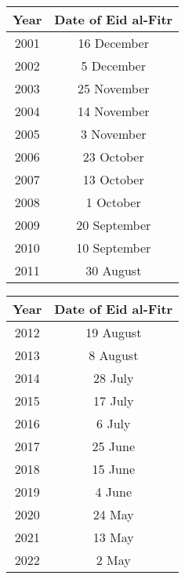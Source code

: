 \documentclass[11pt]{article}
\begin{document}
\begin{minipage}{0.5\textwidth}
	\begin{center}
		\begin{tabular}{|c|c|}
			\hline
			Year & Date of Eid al-Fitr \\ \hline
			2001 & 16 December         \\ \hline
			2002 & 5 December          \\ \hline
			2003 & 25 November         \\ \hline
			2004 & 14 November         \\ \hline
			2005 & 3 November          \\ \hline
			2006 & 23 October          \\ \hline
			2007 & 13 October          \\ \hline
			2008 & 1 October           \\ \hline
			2009 & 20 September        \\ \hline
			2010 & 10 September        \\ \hline
			2011 & 30 August           \\ \hline
		
		\end{tabular}
	\end{center}
\end{minipage}
\begin{minipage}{0.5\textwidth}
	\begin{center}
	\begin{tabular}{|c|c|}
		\hline
		Year & Date of Eid al-Fitr \\ \hline
	
		2012 & 19 August           \\ \hline
		2013 & 8 August            \\ \hline
		2014 & 28 July             \\ \hline
		2015 & 17 July             \\ \hline
		2016 & 6 July              \\ \hline
		2017 & 25 June             \\ \hline
		2018 & 15 June             \\ \hline
		2019 & 4 June              \\ \hline
		2020 & 24 May              \\ \hline
		2021 & 13 May              \\ \hline
		2022 & 2 May               \\ \hline
	\end{tabular}
\end{center}
\end{minipage}
\end{document}
